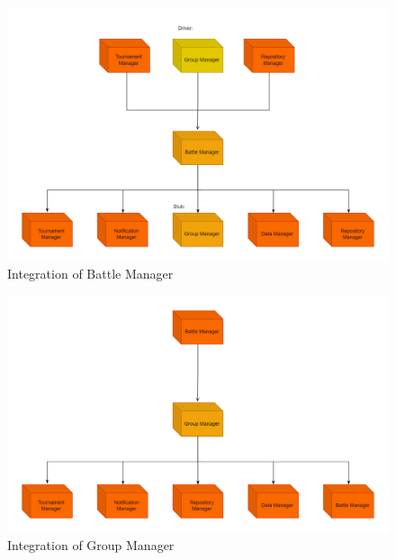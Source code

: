 \documentclass[../DD.tex]{subfiles}
\begin{document}
        \begin{figure}[h!]
            \centering
            \hspace*{-1cm}
            \includegraphics[width=1\textwidth]{../assets/section_5/7.png}
            \caption{Integration of Battle Manager}
        \end{figure}

        \begin{figure}[h!]
            \centering
            \hspace*{-1cm}
            \includegraphics[width=1\textwidth]{../assets/section_5/8.png}
            \caption{Integration of Group Manager}
        \end{figure}
    \restoregeometry
        
\end{document}
